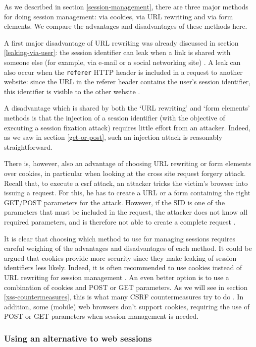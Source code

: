 As we described in section \ref{session-management}, there are three major methods for doing session management: via cookies, via URL rewriting and via form elements. We compare the advantages and disadvantages of these methods here.

A first major disadvantage of URL rewriting was already discussed in section \ref{leaking-via-user}: the session identifier can leak when a link is shared with someone else (for example, via e-mail or a social networking site) \cite{Johnston2004}. A leak can also occur when the \texttt{referer} HTTP header is included in a request to another website: since the URL in the referer header contains the user's session identifier, this identifier is visible to the other website \cite{Fu2001}.

A disadvantage which is shared by both the `URL rewriting' and `form elements' methods is that the injection of a session identifier (with the objective of executing a session fixation attack) requires little effort from an attacker. Indeed, as we saw in section \ref{get-or-post}, such an injection attack is reasonably straightforward.

There is, however, also an advantage of choosing URL rewriting or form elements over cookies, in particular when looking at the cross site request forgery attack. Recall that, to execute a \gls{csrf} attack, an attacker tricks the victim's browser into issuing a request. For this, he  has to create a URL or a form containing the right GET/POST parameters for the attack. However, if the SID is one of the parameters that must be included in the request, the attacker does not know all required parameters, and is therefore not able to create a complete request \cite{Johnston2004}.

It is clear that choosing which method to use for managing sessions requires careful weighing of the advantages and disadvantages of each method. It could be argued that cookies provide more security since they make leaking of session identifiers less likely. Indeed, it is often recommended to use cookies instead of URL rewriting for session management \cite{Zhong2006,Vamosi2006}. An even better option is to use a combination of cookies and POST or GET parameters. As we will see in section \ref{xss-countermeasures}, this is what many CSRF countermeasures try to do \cite{Jovanovic2006,Johns2006}. In addition, some (mobile) web browsers don't support cookies, requiring the use of POST or GET parameters when session management is needed.

\subsubsection{Using an alternative to web sessions}


